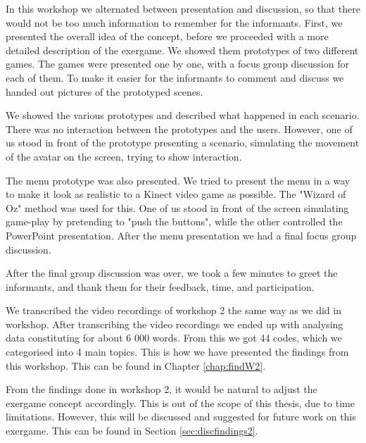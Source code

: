 In this workshop we alternated between presentation and discussion, so that there would not be too much information to remember for the informants. First, we presented the overall idea of the concept, before we proceeded with a more detailed description of the exergame. We showed them prototypes of two different games. The games were presented one by one, with a focus group discussion for each of them. To make it easier for the informants to comment and discuss we handed out pictures of the prototyped scenes.

We showed the various prototypes and described what happened in each scenario. There was no interaction between the prototypes and the users. However, one of us stood in front of the prototype presenting a scenario, simulating the movement of the avatar on the screen, trying to show interaction. 

The menu prototype was also presented. We tried to present the menu in a way to make it look as realistic to a Kinect video game as possible. The "Wizard of Oz" method was used for this. One of us stood in front of the screen simulating game-play by pretending to "push the buttons", while the other controlled the PowerPoint presentation.  After the menu presentation we had a final focus group discussion. 

After the final group discussion was over, we took a few minutes to greet the informants, and thank them for their feedback, time, and participation. 

We transcribed the video recordings of workshop 2 the same way as we did in workshop. After transcribing the video recordings we ended up with analysing data constituting for about 6 000 words.  From this we got 44 codes, which we categorised into 4 main topics. This is how we have presented the findings from this workshop. This can be found in Chapter \ref{chap:findW2}.

From the findings done in workshop 2, it would be natural to adjust the exergame concept accordingly. This is out of the scope of this thesis, due to time limitations. However, this will be discussed and suggested for future work on this exergame. This can be found in Section \ref{sec:discfindings2}.

 
 
 

